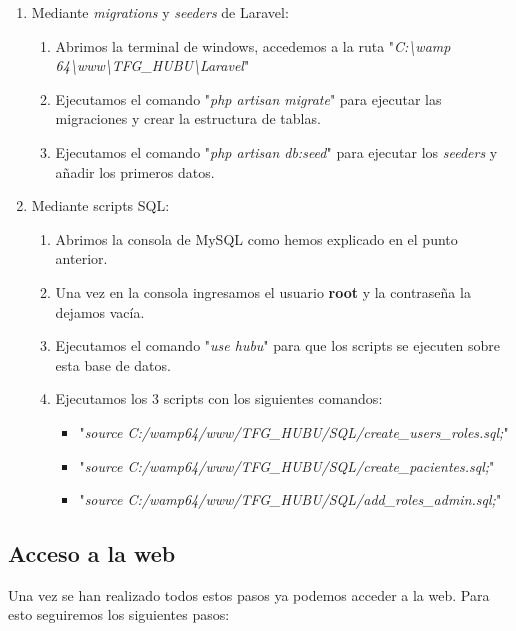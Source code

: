 \begin{enumerate}
    \item Mediante \textit{migrations} y \textit{seeders} de Laravel:
    \begin{enumerate}
        \item Abrimos la terminal de windows, accedemos a la ruta "\textit{C:\textbackslash{}wamp\\64\textbackslash{}www\textbackslash{}TFG\_HUBU\textbackslash{}Laravel}"
        \item Ejecutamos el comando "\textit{php artisan migrate}" para ejecutar las migraciones y crear la estructura de tablas.
        \item Ejecutamos el comando "\textit{php artisan db:seed}" para ejecutar los \textit{seeders} y añadir los primeros datos.
    \end{enumerate}
    \item Mediante scripts SQL:
    \begin{enumerate}
        \item Abrimos la consola de MySQL como hemos explicado en el punto anterior.
        \item Una vez en la consola ingresamos el usuario \textbf{root} y la contraseña la dejamos vacía.
        \item Ejecutamos el comando "\textit{use hubu}" para que los scripts se ejecuten sobre esta base de datos.
        \item Ejecutamos los 3 scripts con los siguientes comandos:
        \begin{itemize}
            \item "\textit{source C:/wamp64/www/TFG\_HUBU/SQL/create\_users\_roles.sql;}"
            \item "\textit{source C:/wamp64/www/TFG\_HUBU/SQL/create\_pacientes.sql;}"
            \item "\textit{source C:/wamp64/www/TFG\_HUBU/SQL/add\_roles\_admin.sql;}"
        \end{itemize}
    \end{enumerate}
\end{enumerate}

\subsection{Acceso a la web}

Una vez se han realizado todos estos pasos ya podemos acceder a la web. Para esto seguiremos los siguientes pasos:

